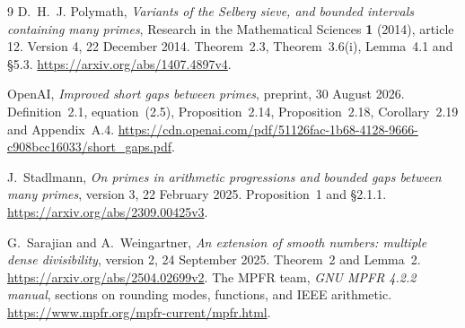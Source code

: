 \documentclass[11pt,a4paper]{article}
\theoremstyle{definition}\newtheorem{definition}[theorem]{Definition}
\theoremstyle{remark}\newtheorem{remark}[theorem]{Remark}
\numberwithin{equation}{section}
\begin{document}
\begingroup\small
\begin{thebibliography}{9}
D.~H.~J. Polymath, \emph{Variants of the Selberg sieve, and bounded intervals containing many primes},
Research in the Mathematical Sciences \textbf{1} (2014), article 12.
Version 4, 22 December 2014. Theorem~2.3, Theorem~3.6(i), Lemma~4.1 and \S5.3.
\url{https://arxiv.org/abs/1407.4897v4}.

OpenAI, \emph{Improved short gaps between primes}, preprint, 30 August 2026.
Definition~2.1, equation~(2.5), Proposition~2.14, Proposition~2.18, Corollary~2.19 and Appendix~A.4.
\url{https://cdn.openai.com/pdf/51126fac-1b68-4128-9666-c908bcc16033/short_gaps.pdf}.

J.~Stadlmann, \emph{On primes in arithmetic progressions and bounded gaps between many primes},
version 3, 22 February 2025. Proposition~1 and \S2.1.1.
\url{https://arxiv.org/abs/2309.00425v3}.

G.~Sarajian and A.~Weingartner, \emph{An extension of smooth numbers: multiple dense divisibility},
version 2, 24 September 2025. Theorem~2 and Lemma~2.
\url{https://arxiv.org/abs/2504.02699v2}.
The MPFR team, \emph{GNU MPFR 4.2.2 manual}, sections on rounding modes, functions, and IEEE arithmetic.
\url{https://www.mpfr.org/mpfr-current/mpfr.html}.
\end{thebibliography}
\endgroup
\end{document}
